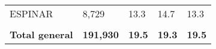 \begin{tabular}{lllll}
\cellcolor[HTML]{FF5050}ESPINAR                                & 8,729                                                                 & 13.3                                                                             & 14.7                                                                        & 13.3                                                                                \\
&                                                                       &                                                                                  &                                                                             &                                                                                     \\
\rowcolor[HTML]{DDEBF7} 
\textbf{Total   general}                                       & \textbf{191,930}                                                      & \textbf{19.5}                                                                    & \textbf{19.3}                                                               & \textbf{19.5}                                                                      
\end{tabular}